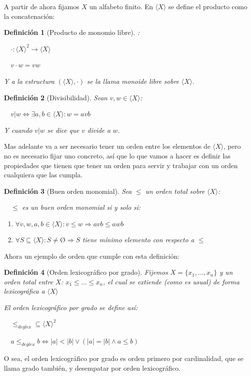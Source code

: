 \documentclass{amsbook}
\theoremstyle{customstyle}
\newtheorem{definition}{Definición}[section]
\begin{document}
A partir de ahora fijamos $X$ un alfabeto finito. En $⟨X⟩$ se define el producto como la concatenación:

\begin{definition}[Producto de monomio libre]: %

  $· : ⟨X⟩^2 → ⟨X⟩$

  $v · w = vw$

Y a la estructura $(⟨X⟩, ·)$ se la llama monoide libre sobre $⟨X⟩$.
\end{definition}

\begin{definition}[Divisibilidad]
Sean $v, w ∈ ⟨X⟩$:

  $v | w ⇔ ∃a , b ∈ ⟨X⟩ : w = avb$

Y cuando $v | w$ se dice que $v$ divide a $w$.
\end{definition}

Mas adelante va a ser necesario tener un orden entre los elementos de $⟨X⟩$, pero no es necesario fijar uno concreto, así que lo que vamos a hacer es definir las propiedades que tienen que tener un orden para servir y trabajar con un orden cualquiera que las cumpla.

\begin{definition}[Buen orden monomial]
Sea $≤$ un orden total sobre $⟨X⟩$:

  $≤$ es un buen orden monomial si y solo si:
\begin{enumerate}[label=(\alph*)]
\item $∀v, w, a, b ∈ ⟨X⟩ : v ≤ w ⇒ avb ≤ awb$

\item $∀S ⊆ ⟨X⟩ : S ≠ Ø ⇒ S$ tiene mínimo elemento con respecto a $≤$
\end{enumerate}
\end{definition}

Ahora un ejemplo de orden que cumple con esta definición:

\begin{definition}[Orden lexicográfico por grado]
Fijemos $X = \{x_1, …, x_n\}$ y un orden total entre $X$: $x_1 ≤ … ≤ x_n$, el cual se extiende (como es usual) de forma lexicográfica a $⟨X⟩$

El orden lexicográfico por grado se define así:

  $≤_{deglex} ⊆ ⟨X⟩^2$

  $a ≤_{deglex} b ⇔ |a| < |b| ∨ (|a| = |b| ∧ a ≤ b)$
\end{definition}

O sea, el orden lexicográfico por grado es orden primero por cardinalidad, que se llama grado también, y desempatar por orden lexicográfico.
\end{document}
